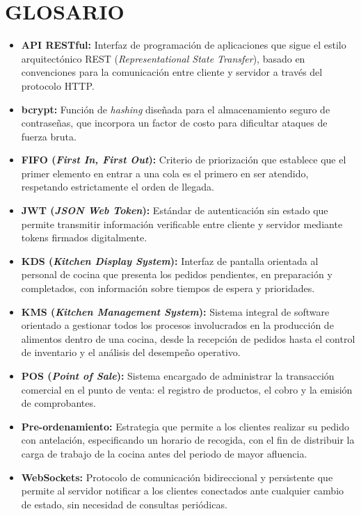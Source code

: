 \chapter{GLOSARIO}
\begin{itemize}
    \item \textbf{API RESTful:} Interfaz de programación de aplicaciones que sigue el estilo arquitectónico REST (\textit{Representational State Transfer}), basado en convenciones para la comunicación entre cliente y servidor a través del protocolo HTTP.
    \item \textbf{bcrypt:} Función de \textit{hashing} diseñada para el almacenamiento seguro de contraseñas, que incorpora un factor de costo para dificultar ataques de fuerza bruta.
    \item \textbf{FIFO (\textit{First In, First Out}):} Criterio de priorización que establece que el primer elemento en entrar a una cola es el primero en ser atendido, respetando estrictamente el orden de llegada.
    \item \textbf{JWT (\textit{JSON Web Token}):} Estándar de autenticación sin estado que permite transmitir información verificable entre cliente y servidor mediante tokens firmados digitalmente.
    \item \textbf{KDS (\textit{Kitchen Display System}):} Interfaz de pantalla orientada al personal de cocina que presenta los pedidos pendientes, en preparación y completados, con información sobre tiempos de espera y prioridades.
    \item \textbf{KMS (\textit{Kitchen Management System}):} Sistema integral de software orientado a gestionar todos los procesos involucrados en la producción de alimentos dentro de una cocina, desde la recepción de pedidos hasta el control de inventario y el análisis del desempeño operativo.
    \item \textbf{POS (\textit{Point of Sale}):} Sistema encargado de administrar la transacción comercial en el punto de venta: el registro de productos, el cobro y la emisión de comprobantes.
    \item \textbf{Pre-ordenamiento:} Estrategia que permite a los clientes realizar su pedido con antelación, especificando un horario de recogida, con el fin de distribuir la carga de trabajo de la cocina antes del periodo de mayor afluencia.
    \item \textbf{WebSockets:} Protocolo de comunicación bidireccional y persistente que permite al servidor notificar a los clientes conectados ante cualquier cambio de estado, sin necesidad de consultas periódicas.
\end{itemize}